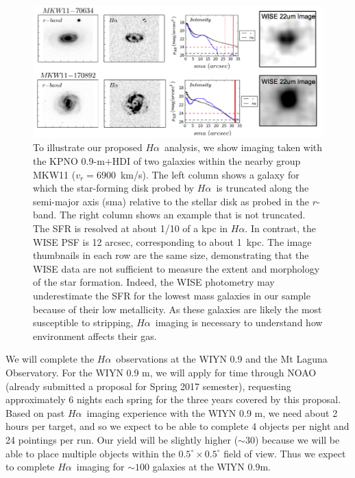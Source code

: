 \documentclass[11pt, preprint]{aastex}
\newcommand{\ha}{$H\alpha$}
\begin{document}
\begin{figure}[h]
\centering
\includegraphics[width=.85\textwidth]{HalphaProfileWISE.png}
\caption{\small
To illustrate our proposed \ha \  analysis, we show
imaging taken with the KPNO 0.9-m$+$HDI of two galaxies within the
nearby group  MKW11 ($v_r = 6900$~km/s). The left column shows a
galaxy for which the star-forming disk probed by \ha \ is truncated
along the semi-major axis (sma)  relative to the stellar disk as
probed in the $r$-band. The right column  shows an example that is not
truncated.  The SFR is resolved  at about 1/10 of a kpc in \ha. In
contrast, the WISE PSF is 12 arcsec, corresponding to about 1~kpc. The image thumbnails in each row are the same size, demonstrating
that the WISE data are not sufficient to measure the extent and
morphology of the star formation.   Indeed, the WISE photometry may
underestimate the SFR for  the lowest mass galaxies in our sample
because of their low metallicity.  As these galaxies are likely the
most susceptible to stripping, \ha\ imaging is necessary to understand
how environment affects their gas.}
\label{fig3}
\end{figure}


We will complete the \ha \ observations at the WIYN 0.9 and the Mt
Laguna Observatory.  For the WIYN 0.9 m, we will apply for time
through NOAO (already submitted a proposal for Spring 2017 semester), requesting
approximately 6 nights each spring for the three years covered by this
proposal.  Based on past \ha \ imaging experience with the WIYN 0.9 m,
we need about 2 hours per target, and so we expect to be able to
complete 4 objects per night and 24 pointings per run.  Our yield will 
be slightly higher ($\sim 30$) because we will be able to place multiple objects within
the $0.5^\circ \times 0.5^\circ$ field of view.  Thus we expect to
complete \ha \ imaging for
$\sim 100$ galaxies at the WIYN 0.9m. 
\end{document}
